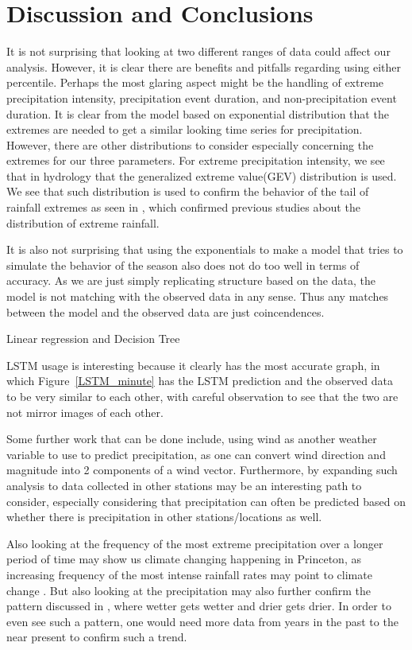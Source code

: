 \documentclass[11pt]{report}
\begin{document}
\section{Discussion and Conclusions}\label{sec:conclusions}


It is not surprising that looking at two different ranges of data could
affect our analysis. However, it is clear there are benefits and pitfalls
regarding using either percentile. Perhaps the most glaring aspect might
be the handling of extreme precipitation intensity, precipitation event
duration, and non-precipitation event duration. It is clear from the
model based on exponential distribution that the extremes are needed to
get a similar looking time series for precipitation. However, there are
other distributions to consider especially concerning the extremes for
our three parameters. For extreme precipitation intensity, we see that in
hydrology that the generalized extreme value(GEV) distribution is used.
We see that such distribution is used to confirm the behavior of the tail
of rainfall extremes as seen in \cite[]{Hydro_dist}, which confirmed
previous studies about the distribution of extreme rainfall.  

It is also not surprising that using the exponentials to make a model that tries to simulate the behavior of the season also does not do too well in terms of accuracy. As we are just simply replicating structure based on the data, the model is not matching with the observed data in any sense. Thus any matches between the model and the observed data are just coincendences. 

Linear regression and Decision Tree

LSTM usage is interesting because it clearly has the most accurate graph, in which Figure~\ref{LSTM_minute} has the LSTM prediction and the observed data to be very similar to each other, with careful observation to see that the two are not mirror images of each other.  

Some further work that can be done include, using wind as another weather
variable to use to predict precipitation, as one can convert wind
direction and magnitude into 2 components of a wind vector. Furthermore,
by expanding such analysis to data collected in other stations may be an
interesting path to consider, especially considering that precipitation
can often be predicted based on whether there is precipitation in other
stations/locations as well. 

Also looking at the frequency of the most extreme precipitation over a longer period of time may show us climate changing happening in Princeton, as  increasing frequency of the most intense rainfall rates may point to climate change . But also looking at the precipitation may also further confirm the pattern discussed in \cite{Held}, where wetter gets wetter and drier gets drier. In order to even see such a pattern, one would need more data from years in the past to the near present to confirm such a trend. 
\small
\renewcommand{\bibsep}{0em}
\end{document}
